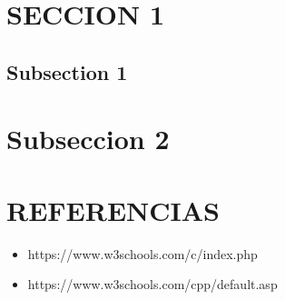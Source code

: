 \section{SECCION 1}

\lipsum[2-3]

\subsection{Subsection 1}

\lipsum[4]


\section{Subseccion 2}

\lipsum[5]

\section*{REFERENCIAS}
\begin{itemize}
    \item https://www.w3schools.com/c/index.php
    \item https://www.w3schools.com/cpp/default.asp
\end{itemize}

